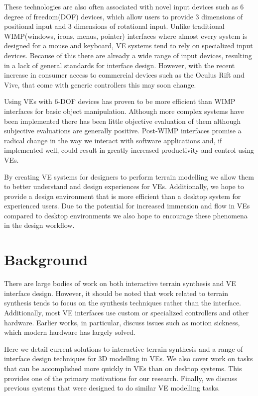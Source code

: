 \documentclass{sig-alternate-05-2015}
\begin{document}
These technologies are also often associated with novel input devices such as 6 degree of freedom(DOF) devices, which allow users to provide 3 dimensions of positional input and 3 dimensions of rotational input. Unlike traditional WIMP(windows, icons, menus, pointer) interfaces where almost every system is designed for a mouse and keyboard, VE systems tend to rely on specialized input devices\cite{Hand1997,Bowman2001}. Because of this there are already a wide range of input devices, resulting in a lack of general standards for interface design. However, with the recent increase in consumer access to commercial devices such as the Oculus Rift and Vive, that come with generic controllers this may soon change.

Using VEs with 6-DOF devices has proven to be more efficient than WIMP interfaces for basic object manipulation\cite{Schultheis2012,Scali2003}. Although more complex systems have been implemented there has been little objective evaluation of them although subjective evaluations are generally positive\cite{Wang2013,Mine2014,Jerald2013}. Post-WIMP interfaces promise a radical change in the way we interact with software applications and, if implemented well, could result in greatly increased productivity and control using VEs.
 
By creating VE systems for designers to perform terrain modelling we allow them to better understand and design experiences for VEs. Additionally, we hope to provide a design environment that is more efficient than a desktop system for experienced users. Due to the potential for increased immersion and flow in VEs compared to desktop environments\cite{Schubert2001} we also hope to encourage these phenomena in the design workflow.
\section{Background}
There are large bodies of work on both interactive terrain synthesis and VE interface design. However, it should be noted that work related to terrain synthesis tends to focus on the synthesis techniques rather than the interface. Additionally, most VE interfaces use custom or specialized controllers and other hardware. Earlier works, in particular, discuss issues such as motion sickness, which modern hardware has largely solved.
 
Here we detail current solutions to interactive terrain synthesis and a range of interface design techniques for 3D modelling in VEs. We also cover work on tasks that can be accomplished more quickly in VEs than on desktop systems. This provides one of the primary motivations for our research. Finally, we discuss previous systems that were designed to do similar VE modelling tasks.
 
\end{document}
